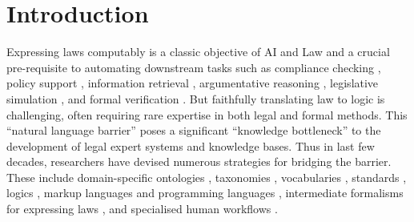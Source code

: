 \documentclass{IOS-Book-Article}
\begin{document}




\section{Introduction}

Expressing laws computably is a classic objective of AI and Law \cite{mccarty_reflections_1977, sergot_british_1986} and a crucial pre-requisite to automating downstream tasks such as compliance checking \cite{palmirani_modelling_2018, hickey_gdpr_2021}, policy support \cite{svensson_expertisze_1992, haan_tracs_1992}, information retrieval \cite{bing_designing_1987}, argumentative reasoning \cite{mochales_study_2008}, legislative simulation \cite{bench-capon_logic_1987, bench-capon_support_1992}, and formal verification \cite{haan_tracs_1992}. But faithfully translating law to logic is challenging, often requiring rare expertise in both legal and formal methods. This ``natural language barrier'' \cite{mccarty_deep_2007} poses a significant ``knowledge bottleneck'' \cite{nazarenko_pragmatic_2021} to the development of legal expert systems and knowledge bases. Thus in last few decades, researchers have devised numerous strategies for bridging the barrier. These include domain-specific ontologies \cite{palmirani_legal_2018}, taxonomies \cite{hulstijn_taxonomy_2020}, vocabularies \cite{hickey_gdpr_2021}, standards \cite{sartor_akoma-ntoso_2011}, logics \cite{prakken_logical_1993}, markup languages \cite{athan_oasis_2013} and programming languages \cite{huttner_catala_2022}, intermediate formalisms for expressing laws \cite{mccarty_language_1989, kralingen_norm_1993, mccarty_deep_2007}, and specialised human workflows \cite{palmirani_legal_2018, witt_converting_2021}.
\end{document}

